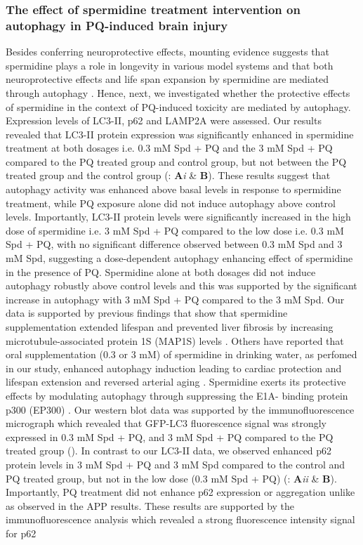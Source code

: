 \subsubsection{The effect of spermidine treatment intervention on autophagy in PQ-induced brain injury}
Besides conferring neuroprotective effects, mounting evidence suggests that spermidine plays a role in longevity in various model systems \citep{Eisenberg2009,Garcia-Prat2016,Minois2012,Morselli2011,Pietrocola2015} and that both neuroprotective effects and life span expansion by spermidine are mediated through autophagy \citep{Eisenberg2009,Gupta2016,Gupta2013,Minois2012,Yue2017}. Hence, next, we investigated whether the protective effects of spermidine in the context of PQ-induced toxicity are mediated by autophagy. Expression levels of LC3-II, p62 and LAMP2A were assessed. Our results revealed that LC3-II protein expression was significantly enhanced in spermidine treatment at both dosages i.e. 0.3 mM Spd + PQ and the 3 mM Spd + PQ compared to the PQ treated group and control group, but not between the PQ treated group and the control group (: \textbf{A}\textit{i} \& \textbf{B}). These results suggest that autophagy activity was enhanced above basal levels in response to spermidine treatment, while PQ exposure alone did not induce autophagy above control levels. Importantly, LC3-II protein levels were significantly increased in the high dose of spermidine i.e. 3 mM Spd + PQ compared to the low dose i.e. 0.3 mM Spd + PQ, with no significant difference observed between 0.3 mM Spd and 3 mM Spd, suggesting a dose-dependent autophagy enhancing effect of spermidine in the presence of PQ. Spermidine alone at both dosages did not induce autophagy robustly above control levels and this was supported by the significant increase in autophagy with 3 mM Spd + PQ compared to the 3 mM Spd. Our data is supported by previous findings that show that spermidine supplementation extended lifespan and prevented liver fibrosis by increasing microtubule-associated protein 1S (MAP1S) levels \citep{Yue2017}. Others have reported that oral supplementation (0.3 or 3 mM) of spermidine in drinking water, as perfomed in our study, enhanced autophagy induction leading to cardiac protection and lifespan extension \citep{Eisenberg2016a} and reversed arterial aging \citep{LaRocca2013}. Spermidine exerts its protective effects by modulating autophagy through suppressing the E1A- binding protein p300 (EP300) \citep{Pietrocola2015}. Our western blot data was supported by the immunofluorescence micrograph which revealed that GFP-LC3 fluorescence signal was strongly expressed in 0.3 mM Spd + PQ, and 3 mM Spd + PQ compared to the PQ treated group (). In contrast to our LC3-II data, we observed enhanced p62 protein levels in 3 mM Spd + PQ and 3 mM Spd compared to the control and PQ treated group, but not in the low dose (0.3 mM Spd + PQ) (: \textbf{A}\textit{ii} \& \textbf{B}). Importantly, PQ treatment did not enhance p62 expression or aggregation unlike as observed in the APP results. These results are supported by the immunofluorescence analysis which revealed a strong fluorescence intensity signal for p62 